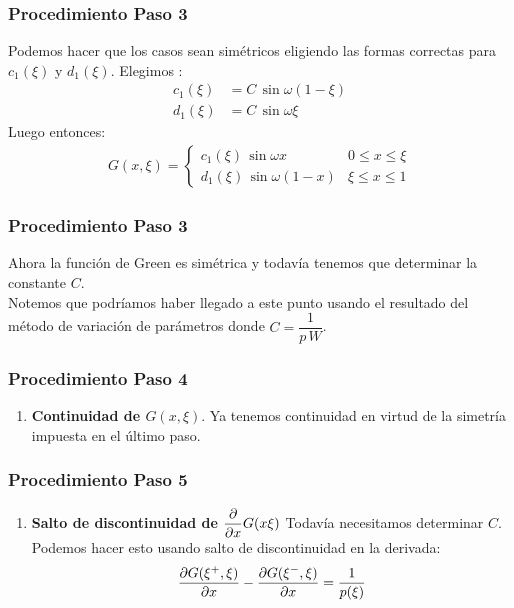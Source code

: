 \documentclass[12pt]{beamer}
\begin{document}
\begin{frame}
\frametitle{Procedimiento Paso 3}
Podemos hacer que los casos sean simétricos eligiendo las formas correctas para $c_{1} (\xi)$ y $d_{1} (\xi)$. Elegimos :
\pause
\begin{align*}
c_{1} (\xi) &= C \, \sin \omega (1 - \xi) \\[0.5em]
d_{1} (\xi) &= C \, \sin \omega \xi
\end{align*}
\pause
Luego entonces:
\pause
\begin{align*}
G (x, \xi) = \begin{cases}
c_{1} (\xi) \, \sin \omega x & 0 \leq x \leq \xi \\[0.5em]
d_{1} (\xi) \, \sin \omega (1 - x) & \xi \leq x \leq 1
\end{cases}
\end{align*}
\end{frame}

\begin{frame}
\frametitle{Procedimiento Paso 3}
Ahora la función de Green es simétrica y todavía tenemos que determinar la constante $C$.
\\
\bigskip
\pause
Notemos que podríamos haber llegado a este punto usando el resultado del método de variación de parámetros donde $C = \dfrac{1}{p \, W}$.
\end{frame}

\begin{frame}
\frametitle{Procedimiento Paso 4}
\begin{enumerate}[<+->]
\conti
\item \textbf{Continuidad de $G (x, \xi)$}.
\pause
Ya tenemos continuidad en virtud de la simetría impuesta en el último paso.
\seti
\end{enumerate}
\end{frame}

\begin{frame}
\frametitle{Procedimiento Paso 5}
\begin{enumerate}[<+->]
\conti
\item \textbf{Salto de discontinuidad de $\displaystyle \pdv{x} G (x \xi)$}
\pause
Todavía necesitamos determinar $C$. Podemos hacer esto usando salto de discontinuidad en la derivada:
\pause
\begin{align*}
\pdv{G (\xi^{+}, \xi)}{x} - \pdv{G (\xi^{-}, \xi)}{x} = \dfrac{1}{p (\xi)}
\end{align*}
\end{enumerate}
\end{frame}
\end{document}
